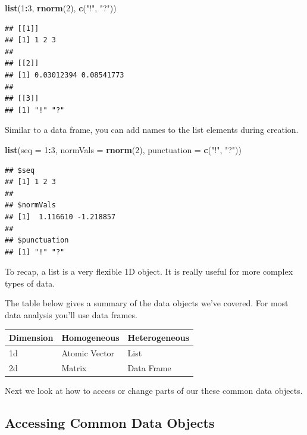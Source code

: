 \documentclass[
]{book}
\newenvironment{Shaded}{\begin{snugshade}}{\end{snugshade}}
\newcommand{\DataTypeTok}[1]{\textcolor[rgb]{0.13,0.29,0.53}{#1}}
\newcommand{\DecValTok}[1]{\textcolor[rgb]{0.00,0.00,0.81}{#1}}
\newcommand{\KeywordTok}[1]{\textcolor[rgb]{0.13,0.29,0.53}{\textbf{#1}}}
\newcommand{\NormalTok}[1]{#1}
\newcommand{\OperatorTok}[1]{\textcolor[rgb]{0.81,0.36,0.00}{\textbf{#1}}}
\newcommand{\StringTok}[1]{\textcolor[rgb]{0.31,0.60,0.02}{#1}}
\theoremstyle{definition}
\theoremstyle{definition}
\theoremstyle{definition}
\theoremstyle{remark}
\begin{document}
\begin{Shaded}
\begin{Highlighting}[]
\KeywordTok{list}\NormalTok{(}\DecValTok{1}\OperatorTok{:}\DecValTok{3}\NormalTok{, }\KeywordTok{rnorm}\NormalTok{(}\DecValTok{2}\NormalTok{), }\KeywordTok{c}\NormalTok{(}\StringTok{"!"}\NormalTok{, }\StringTok{"?"}\NormalTok{))}
\end{Highlighting}
\end{Shaded}

\begin{verbatim}
## [[1]]
## [1] 1 2 3
## 
## [[2]]
## [1] 0.03012394 0.08541773
## 
## [[3]]
## [1] "!" "?"
\end{verbatim}

Similar to a data frame, you can add names to the list elements during creation.

\begin{Shaded}
\begin{Highlighting}[]
\KeywordTok{list}\NormalTok{(}\DataTypeTok{seq =} \DecValTok{1}\OperatorTok{:}\DecValTok{3}\NormalTok{, }\DataTypeTok{normVals =} \KeywordTok{rnorm}\NormalTok{(}\DecValTok{2}\NormalTok{), }\DataTypeTok{punctuation =} \KeywordTok{c}\NormalTok{(}\StringTok{"!"}\NormalTok{, }\StringTok{"?"}\NormalTok{))}
\end{Highlighting}
\end{Shaded}

\begin{verbatim}
## $seq
## [1] 1 2 3
## 
## $normVals
## [1]  1.116610 -1.218857
## 
## $punctuation
## [1] "!" "?"
\end{verbatim}

To recap, a list is a very flexible 1D object. It is really useful for more complex types of data.

The table below gives a summary of the data objects we've covered. For most data analysis you'll use data frames.

\begin{longtable}[]{@{}lll@{}}
\toprule
Dimension & Homogeneous & Heterogeneous\tabularnewline
\midrule
\endhead
1d & Atomic Vector & List\tabularnewline
2d & Matrix & Data Frame\tabularnewline
\bottomrule
\end{longtable}

Next we look at how to access or change parts of our these common data objects.

\hypertarget{accessing-common-data-objects-1}{%
\subsection{Accessing Common Data Objects}\label{accessing-common-data-objects-1}}
\end{document}

